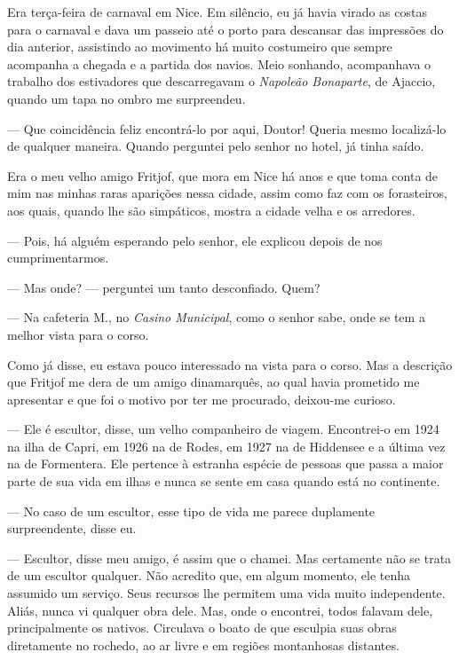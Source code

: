 
Era terça-feira de carnaval em Nice. Em silêncio, eu já havia virado as
costas para o carnaval e dava um passeio até o porto para descansar das
impressões do dia anterior, assistindo ao movimento há muito costumeiro
que sempre acompanha a chegada e a partida dos navios. Meio sonhando,
acompanhava o trabalho dos estivadores que descarregavam o
\emph{Napoleão Bonaparte}, de Ajaccio, quando um tapa no ombro me
surpreendeu.

--- Que coincidência feliz encontrá-lo por aqui, Doutor! Queria mesmo
localizá-lo de qualquer maneira. Quando perguntei pelo senhor no hotel,
já tinha saído.

Era o meu velho amigo Fritjof, que mora em Nice há anos e que toma conta
de mim nas minhas raras aparições nessa cidade, assim como faz com os
forasteiros, aos quais, quando lhe são simpáticos, mostra a cidade velha
e os arredores.

--- Pois, há alguém esperando pelo senhor, ele explicou depois de nos
cumprimentarmos.

--- Mas onde? --- perguntei um tanto desconfiado. Quem?

--- Na cafeteria M.,
no \emph{Casino Municipal}, como o senhor sabe, onde
se tem a melhor vista para o corso.

Como já disse, eu estava pouco interessado na vista para o corso. Mas a
descrição que Fritjof me dera de um amigo dinamarquês, ao qual havia
prometido me apresentar e que foi o motivo por ter me procurado,
deixou-me curioso.

--- Ele é escultor, disse, um velho companheiro de viagem. Encontrei-o em
1924 na ilha de Capri, em 1926 na de Rodes, em 1927 na de Hiddensee e a
última vez na de Formentera. Ele pertence à estranha espécie de pessoas
que passa a maior parte de sua vida em ilhas e nunca se sente em casa
quando está no continente.

--- No caso de um escultor, esse tipo de vida me parece duplamente
surpreendente, disse eu.

--- Escultor, disse meu amigo, é assim que o chamei. Mas certamente não
se trata de um escultor qualquer. Não acredito que, em algum momento,
ele tenha assumido um serviço. Seus recursos lhe permitem uma vida muito
independente. Aliás, nunca vi qualquer obra dele. Mas, onde o encontrei,
todos falavam dele, principalmente os nativos. Circulava o boato de que
esculpia suas obras diretamente no rochedo, ao ar livre e em regiões
montanhosas distantes.

